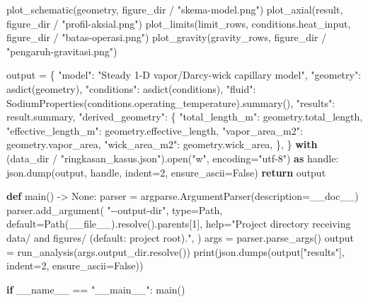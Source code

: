 \documentclass[
  12pt,
  12pt,a4paper,oneside]{report}
\newenvironment{Shaded}{}{}
\newcommand{\BuiltInTok}[1]{\textcolor[rgb]{0.00,0.50,0.00}{#1}}
\newcommand{\ControlFlowTok}[1]{\textcolor[rgb]{0.00,0.44,0.13}{\textbf{#1}}}
\newcommand{\DecValTok}[1]{\textcolor[rgb]{0.25,0.63,0.44}{#1}}
\newcommand{\ImportTok}[1]{\textcolor[rgb]{0.00,0.50,0.00}{\textbf{#1}}}
\newcommand{\KeywordTok}[1]{\textcolor[rgb]{0.00,0.44,0.13}{\textbf{#1}}}
\newcommand{\NormalTok}[1]{#1}
\newcommand{\OperatorTok}[1]{\textcolor[rgb]{0.40,0.40,0.40}{#1}}
\newcommand{\StringTok}[1]{\textcolor[rgb]{0.25,0.44,0.63}{#1}}
\newcommand{\VariableTok}[1]{\textcolor[rgb]{0.10,0.09,0.49}{#1}}
\begin{document}
\begin{Shaded}
\begin{Highlighting}[]
\NormalTok{    plot\_schematic(geometry, figure\_dir }\OperatorTok{/} \StringTok{"skema{-}model.png"}\NormalTok{)}
\NormalTok{    plot\_axial(result, figure\_dir }\OperatorTok{/} \StringTok{"profil{-}aksial.png"}\NormalTok{)}
\NormalTok{    plot\_limits(limit\_rows, conditions.heat\_input, figure\_dir }\OperatorTok{/} \StringTok{"batas{-}operasi.png"}\NormalTok{)}
\NormalTok{    plot\_gravity(gravity\_rows, figure\_dir }\OperatorTok{/} \StringTok{"pengaruh{-}gravitasi.png"}\NormalTok{)}

\NormalTok{    output }\OperatorTok{=}\NormalTok{ \{}
        \StringTok{"model"}\NormalTok{: }\StringTok{"Steady 1{-}D vapor/Darcy{-}wick capillary model"}\NormalTok{,}
        \StringTok{"geometry"}\NormalTok{: asdict(geometry),}
        \StringTok{"conditions"}\NormalTok{: asdict(conditions),}
        \StringTok{"fluid"}\NormalTok{: SodiumProperties(conditions.operating\_temperature).summary(),}
        \StringTok{"results"}\NormalTok{: result.summary,}
        \StringTok{"derived\_geometry"}\NormalTok{: \{}
            \StringTok{"total\_length\_m"}\NormalTok{: geometry.total\_length,}
            \StringTok{"effective\_length\_m"}\NormalTok{: geometry.effective\_length,}
            \StringTok{"vapor\_area\_m2"}\NormalTok{: geometry.vapor\_area,}
            \StringTok{"wick\_area\_m2"}\NormalTok{: geometry.wick\_area,}
\NormalTok{        \},}
\NormalTok{    \}}
    \ControlFlowTok{with}\NormalTok{ (data\_dir }\OperatorTok{/} \StringTok{"ringkasan\_kasus.json"}\NormalTok{).}\BuiltInTok{open}\NormalTok{(}\StringTok{"w"}\NormalTok{, encoding}\OperatorTok{=}\StringTok{"utf{-}8"}\NormalTok{) }\ImportTok{as}\NormalTok{ handle:}
\NormalTok{        json.dump(output, handle, indent}\OperatorTok{=}\DecValTok{2}\NormalTok{, ensure\_ascii}\OperatorTok{=}\VariableTok{False}\NormalTok{)}
    \ControlFlowTok{return}\NormalTok{ output}


\KeywordTok{def}\NormalTok{ main() }\OperatorTok{{-}\textgreater{}} \VariableTok{None}\NormalTok{:}
\NormalTok{    parser }\OperatorTok{=}\NormalTok{ argparse.ArgumentParser(description}\OperatorTok{=}\NormalTok{\_\_doc\_\_)}
\NormalTok{    parser.add\_argument(}
        \StringTok{"{-}{-}output{-}dir"}\NormalTok{, }\BuiltInTok{type}\OperatorTok{=}\NormalTok{Path, default}\OperatorTok{=}\NormalTok{Path(}\VariableTok{\_\_file\_\_}\NormalTok{).resolve().parents[}\DecValTok{1}\NormalTok{],}
        \BuiltInTok{help}\OperatorTok{=}\StringTok{"Project directory receiving data/ and figures/ (default: project root)."}\NormalTok{,}
\NormalTok{    )}
\NormalTok{    args }\OperatorTok{=}\NormalTok{ parser.parse\_args()}
\NormalTok{    output }\OperatorTok{=}\NormalTok{ run\_analysis(args.output\_dir.resolve())}
    \BuiltInTok{print}\NormalTok{(json.dumps(output[}\StringTok{"results"}\NormalTok{], indent}\OperatorTok{=}\DecValTok{2}\NormalTok{, ensure\_ascii}\OperatorTok{=}\VariableTok{False}\NormalTok{))}


\ControlFlowTok{if} \VariableTok{\_\_name\_\_} \OperatorTok{==} \StringTok{"\_\_main\_\_"}\NormalTok{:}
\NormalTok{    main()}
\end{Highlighting}
\end{Shaded}
\end{document}
